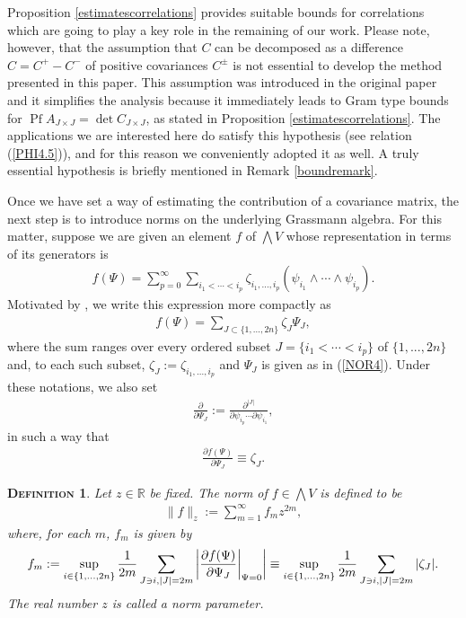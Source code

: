 \documentclass[12pt,twoside]{amsart}
\newtheorem{defi}{\textsc{Definition}}[section]
\numberwithin{equation}{section}
\begin{document}
Proposition \ref{estimatescorrelations} provides suitable bounds for correlations which are going to play a key role in the remaining of our work. Please note, however, that the assumption that $C$ can be decomposed as a difference $C = C^{+}-C^{-}$ of positive covariances $C^{\pm}$ is not essential to develop the method presented in this paper. This assumption was introduced in the original paper \cite{BryWri} and it simplifies the analysis because it immediately leads to Gram type bounds for $\operatorname{Pf}A_{J \times J} = \det C_{J \times J}$, as stated in Proposition \ref{estimatescorrelations}. The applications we are interested here do satisfy this hypothesis (see relation (\ref{PHI4.5})), and for this reason we conveniently adopted it as well. A truly essential hypothesis is briefly mentioned in Remark \ref{boundremark}. 

Once we have set a way of estimating the contribution of a covariance matrix, the next step is to introduce norms on the underlying Grassmann algebra. For this matter, suppose we are given an element $f$ of $\bigwedge V$ whose representation in terms of its generators is 
\begin{eqnarray}
f(\Psi) = \sum_{p=0}^{\infty}\sum_{i_{1}< \cdots < i_{p}}\zeta_{i_{1},...,i_{p}}(\psi_{i_{1}}\wedge \cdots \wedge \psi_{i_{p}}). \nonumber
\end{eqnarray}
Motivated by \cite{BryWri}, we write this expression more compactly as
\begin{eqnarray}
f(\Psi) = \sum_{J\subset \{1,...,2n\}}\zeta_{J}\Psi_{J}, \label{NOR6}
\end{eqnarray}
where the sum ranges over every ordered subset $J= \{i_{1}<\cdots < i_{p}\}$ of $\{1,...,2n\}$ and, to each such subset, $\zeta_{J} := \zeta_{i_{1},...,i_{p}}$ and $\Psi_{J}$ is given as in (\ref{NOR4}). Under these notations, we also set
\begin{eqnarray}
\frac{\partial}{\partial \Psi_{J}} := \frac{\partial^{|J|}}{\partial \psi_{i_{p}}\cdots \partial \psi_{i_{1}}}, \label{NOR7}
\end{eqnarray}
in such a way that
\begin{eqnarray}
\frac{\partial f(\Psi)}{\partial \Psi_{J}} \equiv \zeta_{J}. \label{NOR8}
\end{eqnarray}

\begin{defi}\label{normsgrassmann} Let $z \in \mathbb{R}$ be fixed. The norm of $f \in \bigwedge V$ is defined to be
\begin{eqnarray}
\|f\|_{z} := \sum_{m=1}^{\infty}f_{m}z^{2m}, \label{NOR9}
\end{eqnarray}
where, for each $m$, $f_{m}$ is given by
\begin{eqnarray}
f_{m} := \sup_{i\in \{1,...,2n\}}\frac{1}{2m}\sum_{J \ni i, |J| = 2m}\bigg{|}\frac{\partial f(\Psi)}{\partial \Psi_{J}}\bigg{|}_{\Psi=0}\bigg{|} \equiv \sup_{i\in \{1,...,2n\}}\frac{1}{2m}\sum_{J \ni i, |J| = 2m}|\zeta_{J}|. \label{NOR10}
\end{eqnarray}
The real number $z$ is called a norm parameter.
\end{defi}
\end{document}
